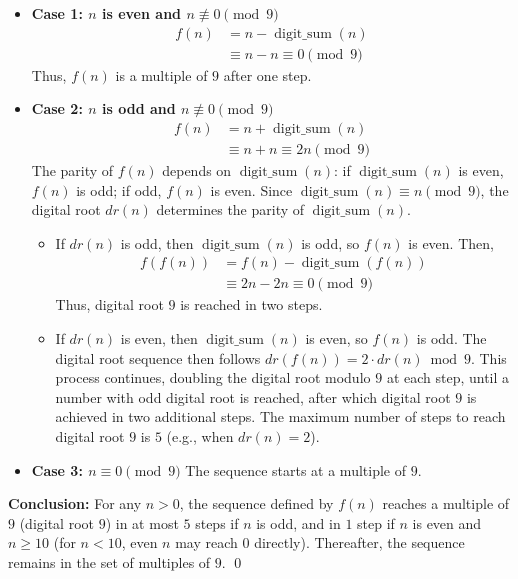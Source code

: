\documentclass[12pt]{article}
\begin{document}
\begin{itemize}
    \item \textbf{Case 1: $n$ is even and $n \not\equiv 0 \pmod{9}$}
    \begin{align*}
        f(n) &= n - \operatorname{digit\_sum}(n) \\
        &\equiv n - n \equiv 0 \pmod{9}
    \end{align*}
    Thus, $f(n)$ is a multiple of $9$ after one step.

    \item \textbf{Case 2: $n$ is odd and $n \not\equiv 0 \pmod{9}$}
    \begin{align*}
        f(n) &= n + \operatorname{digit\_sum}(n) \\
        &\equiv n + n \equiv 2n \pmod{9}
    \end{align*}
    The parity of $f(n)$ depends on $\operatorname{digit\_sum}(n)$: if $\operatorname{digit\_sum}(n)$ is even, $f(n)$ is odd; if odd, $f(n)$ is even. Since $\operatorname{digit\_sum}(n) \equiv n \pmod{9}$, the digital root $dr(n)$ determines the parity of $\operatorname{digit\_sum}(n)$.

    \begin{itemize}
        \item If $dr(n)$ is odd, then $\operatorname{digit\_sum}(n)$ is odd, so $f(n)$ is even. Then,
        \begin{align*}
            f(f(n)) &= f(n) - \operatorname{digit\_sum}(f(n)) \\
            &\equiv 2n - 2n \equiv 0 \pmod{9}
        \end{align*}
        Thus, digital root $9$ is reached in two steps.

        \item If $dr(n)$ is even, then $\operatorname{digit\_sum}(n)$ is even, so $f(n)$ is odd. The digital root sequence then follows $dr(f(n)) = 2 \cdot dr(n) \bmod 9$. This process continues, doubling the digital root modulo $9$ at each step, until a number with odd digital root is reached, after which digital root $9$ is achieved in two additional steps. The maximum number of steps to reach digital root $9$ is $5$ (e.g., when $dr(n) = 2$).
    \end{itemize}

    \item \textbf{Case 3: $n \equiv 0 \pmod{9}$}
    The sequence starts at a multiple of $9$.
\end{itemize}
\textbf{Conclusion:} For any $n > 0$, the sequence defined by $f(n)$ reaches a multiple of $9$ (digital root $9$) in at most $5$ steps if $n$ is odd, and in $1$ step if $n$ is even and $n \geq 10$ (for $n < 10$, even $n$ may reach $0$ directly). Thereafter, the sequence remains in the set of multiples of $9$.
\qed
\end{document}
